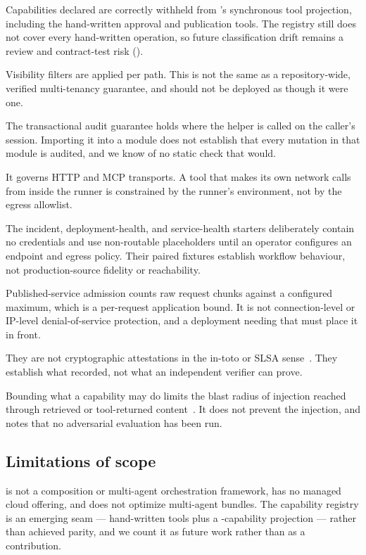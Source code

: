  Capabilities declared
 are correctly withheld from \aria{}'s synchronous tool projection,
including the hand-written approval and publication tools. The registry still does
not cover every hand-written operation, so future classification drift remains a
review and contract-test risk ().

 Visibility filters are
applied per path. This is not the same as a repository-wide, verified multi-tenancy
guarantee, and \sys should not be deployed as though it were one.

 The transactional
audit guarantee holds where the helper is called on the caller's session. Importing
it into a module does not establish that every mutation in that module is audited,
and we know of no static check that would.

 It governs HTTP and MCP
transports. A tool that makes its own network calls from inside the runner is
constrained by the runner's environment, not by the egress allowlist.

 The
incident, deployment-health, and service-health starters deliberately contain no
credentials and use non-routable placeholders until an operator configures an
endpoint and egress policy.  Their paired fixtures establish workflow behaviour,
not production-source fidelity or reachability.

 Published-service admission counts raw
request chunks against a configured maximum, which is a per-request application
bound. It is not connection-level or IP-level denial-of-service protection, and a
deployment needing that must place it in front.

 They are not cryptographic
attestations in the in-toto or SLSA sense~\cite{torresarias2019intoto,slsa}. They
establish what \sys recorded, not what an independent verifier can prove.

 Bounding what a capability may do
limits the blast radius of injection reached through retrieved or tool-returned
content~\cite{greshake2023injection,perez2022ignore}. It does not prevent the
injection, and  notes that no adversarial evaluation has been run.

\subsection{Limitations of scope}

\sys is not a composition or multi-agent orchestration framework, has no managed
cloud offering, and does not optimize multi-agent bundles. The \aria{} capability
registry is an emerging seam --- \statAriaTools{} hand-written tools plus a
\statAriaProjected{}-capability projection --- rather than achieved parity, and we
count it as future work rather than as a contribution.
